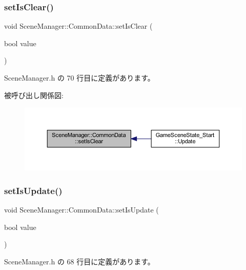 \subsubsection{\texorpdfstring{set\+Is\+Clear()}{setIsClear()}}
{\footnotesize\ttfamily void Scene\+Manager\+::\+Common\+Data\+::set\+Is\+Clear (\begin{DoxyParamCaption}\item[{bool}]{value }\end{DoxyParamCaption})\hspace{0.3cm}{\ttfamily [inline]}}



 Scene\+Manager.\+h の 70 行目に定義があります。

被呼び出し関係図\+:
\nopagebreak
\begin{figure}[H]
\begin{center}
\leavevmode
\includegraphics[width=350pt]{class_scene_manager_1_1_common_data_a63ed55beac6b37243cafdbec26870fc3_icgraph}
\end{center}
\end{figure}
\mbox{\label{class_scene_manager_1_1_common_data_acff0faeef41334781fc49184ada1a5a4}} 
\subsubsection{\texorpdfstring{set\+Is\+Update()}{setIsUpdate()}}
{\footnotesize\ttfamily void Scene\+Manager\+::\+Common\+Data\+::set\+Is\+Update (\begin{DoxyParamCaption}\item[{bool}]{value }\end{DoxyParamCaption})\hspace{0.3cm}{\ttfamily [inline]}}



 Scene\+Manager.\+h の 68 行目に定義があります。

